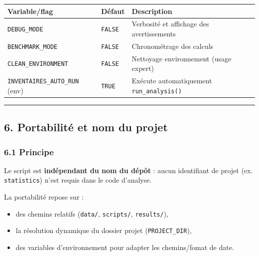 {\def\LTcaptype{none} %
\begin{longtable}[]{@{}
  >{\raggedright\arraybackslash}p{}
  >{\raggedright\arraybackslash}p{}
  >{\raggedright\arraybackslash}p{}@{}}
\toprule\noalign{}
\begin{minipage}[b]{\linewidth}\raggedright
Variable/flag
\end{minipage} & \begin{minipage}[b]{\linewidth}\raggedright
Défaut
\end{minipage} & \begin{minipage}[b]{\linewidth}\raggedright
Description
\end{minipage} \\
\midrule\noalign{}
\endhead
\bottomrule\noalign{}
\endlastfoot
\texttt{DEBUG\_MODE} & \texttt{FALSE} & Verbosité et affichage des
avertissements \\
\texttt{BENCHMARK\_MODE} & \texttt{FALSE} & Chronométrage des calculs \\
\texttt{CLEAN\_ENVIRONMENT} & \texttt{FALSE} & Nettoyage environnement
(usage expert) \\
\texttt{INVENTAIRES\_AUTO\_RUN} (env) & \texttt{TRUE} & Exécute
automatiquement \texttt{run\_analysis()} \\
\end{longtable}
}

\begin{center}\rule{0.5\linewidth}{0.5pt}\end{center}

\subsection{6. Portabilité et nom du
projet}\label{portabilituxe9-et-nom-du-projet}

\subsubsection{6.1 Principe}\label{principe}

Le script est \textbf{indépendant du nom du dépôt} : aucun identifiant
de projet (ex. \texttt{statistics}) n'est requis dans le code d'analyse.

La portabilité repose sur :

\begin{itemize}
\tightlist
\item
  des chemins relatifs (\texttt{data/}, \texttt{scripts/},
  \texttt{results/}),
\item
  la résolution dynamique du dossier projet (\texttt{PROJECT\_DIR}),
\item
  des variables d'environnement pour adapter les chemins/fomat de date.
\end{itemize}

